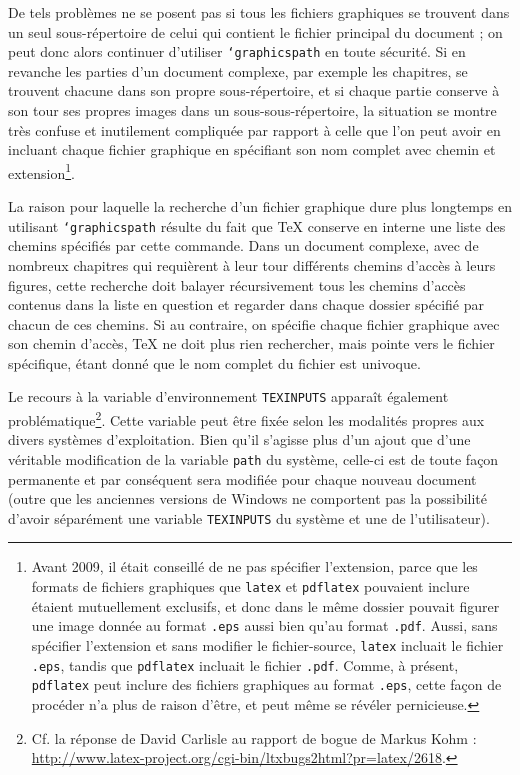 \documentclass[fontsize=11pt, paper=a4, pagesize, captions=tableheading, numbers=enddot, toc=graduated, footnotes=multiple]{scrartcl}%
\DeclareRobustCommand*{\Macro}[1]{\mbox{\texttt{\char`\\#1}}}
\begin{document}
 De tels problèmes ne se posent pas si tous les fichiers graphiques se trouvent dans un seul sous-répertoire de celui qui contient le fichier principal du document ; on peut donc alors continuer d’utiliser \Macro{graphicspath} en toute sécurité. Si en revanche les parties d’un document complexe, par exemple les chapitres, se trouvent chacune dans son propre sous-répertoire, et si chaque partie conserve à son tour ses propres images dans un sous-sous-répertoire, la situation se montre très confuse et inutilement compliquée par rapport à celle que l’on peut avoir en incluant chaque fichier graphique en spécifiant son nom complet avec chemin et extension\footnote{Avant 2009, il était conseillé de ne pas spécifier l’extension, parce que les formats de fichiers graphiques que \texttt{latex} et \texttt{pdflatex} pouvaient inclure étaient mutuellement exclusifs, et donc dans le même dossier pouvait figurer une image donnée au format \texttt{.eps} aussi bien qu’au format \texttt{.pdf}. Aussi, sans spécifier l’extension et sans modifier le fichier-source, \texttt{latex} incluait le fichier \texttt{.eps}, tandis que \texttt{pdflatex} incluait le fichier \texttt{.pdf}. Comme, à présent, \texttt{pdflatex} peut inclure des fichiers graphiques au format \texttt{.eps}, cette façon de procéder n’a plus de raison d’être, et peut même se révéler pernicieuse.}.

 La raison pour laquelle la recherche d’un fichier graphique dure plus longtemps en utilisant \Macro{graphicspath} résulte du fait que \TeX{} conserve en interne une liste des chemins spécifiés par cette commande. Dans un document complexe, avec de nombreux chapitres qui requièrent à leur tour différents chemins d’accès à leurs figures, cette recherche doit balayer récursivement tous les chemins d’accès contenus dans la liste en question et regarder dans chaque dossier spécifié par chacun de ces chemins. Si au contraire, on spécifie chaque fichier graphique avec son chemin d’accès, \TeX{} ne doit plus rien rechercher, mais pointe vers le fichier spécifique, étant donné que le nom complet du fichier est univoque.

 Le recours à la variable d’environnement \texttt{TEXINPUTS} apparaît également problématique\footnote{Cf. la réponse de David Carlisle au rapport de bogue de Markus Kohm : \url{http://www.latex-project.org/cgi-bin/ltxbugs2html?pr=latex/2618}.}. Cette variable peut être fixée selon les modalités propres aux divers systèmes d’exploitation. Bien qu’il s’agisse plus d’un ajout que d’une véritable modification de la variable \texttt{path} du système, celle-ci est de toute façon permanente et par conséquent sera modifiée pour chaque nouveau document (outre que les anciennes versions de Windows ne comportent pas la possibilité d’avoir séparément une variable \texttt{TEXINPUTS} du système et une de l’utilisateur).
\end{document}
